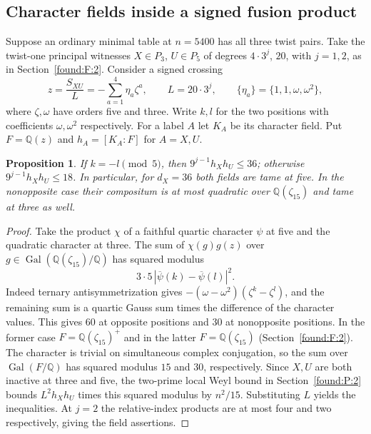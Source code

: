 \documentclass[11pt,a4paper]{article}
\numberwithin{equation}{section}
\newtheorem{proposition}[theorem]{Proposition}
\theoremstyle{remark}
\begin{document}
\subsection{Character fields inside a signed fusion product}\label{found:T:6}
Suppose an ordinary minimal table at $n=5400$ has all three twist pairs. Take the twist-one principal witnesses $X\in P_3$, $U\in P_5$ of degrees $4\cdot3^j$, $20$, with $j=1,2$, as in Section~\ref{found:F:2}. Consider a signed crossing
\[
 z=\frac{S_{XU}}{L}
   =-\sum_{a=1}^4\eta_a\zeta^a,\qquad
 L=20\cdot3^j,\qquad
 \{\eta_a\}=\{1,1,\omega,\omega^2\},
\]
where $\zeta,\omega$ have orders five and three. Write $k,l$ for the two positions with coefficients $\omega,\omega^2$ respectively. For a label $A$ let $K_A$ be its character field. Put $F=\mathbb Q(z)$ and $h_A=[K_A:F]$ for $A=X,U$.

\begin{proposition}\label{found:T:6.1}
If $k=-l\pmod5$, then $9^{j-1}h_Xh_U\le36$; otherwise $9^{j-1}h_Xh_U\le18$. In particular, for $d_X=36$ both fields are tame at five. In the nonopposite case their compositum is at most quadratic over $\mathbb Q(\zeta_{15})$ and tame at three as well.
\end{proposition}
\begin{proof}
Take the product $\chi$ of a faithful quartic character $\psi$ at five and the quadratic character at three. The sum of $\chi(g)g(z)$ over $g\in\operatorname{Gal}(\mathbb Q(\zeta_{15})/\mathbb Q)$ has squared modulus
\[
  3\cdot5\,|\overline\psi(k)-\overline\psi(l)|^2 .
\]
Indeed ternary antisymmetrization gives $-(\omega-\omega^2)(\zeta^k-\zeta^l)$, and the remaining sum is a quartic Gauss sum times the difference of the character values. This gives $60$ at opposite positions and $30$ at nonopposite positions. In the former case $F=\mathbb Q(\zeta_{15})^+$ and in the latter $F=\mathbb Q(\zeta_{15})$ (Section~\ref{found:F:2}). The character is trivial on simultaneous complex conjugation, so the sum over $\operatorname{Gal}(F/\mathbb Q)$ has squared modulus $15$ and $30$, respectively. Since $X,U$ are both inactive at three and five, the two-prime local Weyl bound in Section~\ref{found:P:2} bounds $L^2 h_Xh_U$ times this squared modulus by $n^2/15$. Substituting $L$ yields the inequalities. At $j=2$ the relative-index products are at most four and two respectively, giving the field assertions.
\end{proof}
\end{document}
